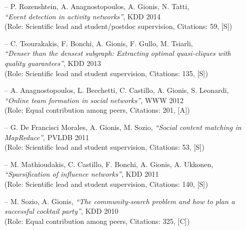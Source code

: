 \documentclass[a4paper,11pt]{res}
\begin{document}
\begin{resume}
\begin{itemize}
\item [--]
{P. Rozenshtein, A. Anagnostopoulos, A. Gionis, N. Tatti}, \\
{\em ``Event detection in activity networks''},  KDD 2014
\\
(Role: Scientific lead and student/postdoc supervision, {Citations:} 59, [S])

\item[--] 
{C. Tsourakakis, F. Bonchi, A. Gionis, F. Gullo, M. Tsiarli}, \\
{\em ``Denser than the densest subgraph: Extracting optimal quasi-cliques with quality guarantees''}, 
KDD 2013 \\
(Role: Scientific lead and student supervision, {Citations:} 135, [S])

\iffalse
\item[--] %
{A. Gionis, E. Terzi, P. Tsaparas}, 
{\em ``Opinion maximization in social networks''},
SDM 2013 \\
(Role: Equal contribution among peers, {Citations:} 61, [A])
\fi

\item[--] %
{A. Anagnostopoulos, L. Becchetti, C. Castillo, A. Gionis, S. Leonardi},\\
{\em ``Online team formation in social networks''}, WWW 2012 \\
(Role: Equal contribution among peers, {Citations:} 201, [A])

\item [--]
{ G. De Francisci Morales, A. Gionis, M. Sozio}, 
{\em ``Social content matching in MapReduce''},
PVLDB 2011
\\
(Role: Scientific lead and student supervision, {Citations:} 53, [S])		

\item [--]
{ M. Mathioudakis, C. Castillo, F. Bonchi, A. Gionis, A. Ukkonen}, \\
{\em ``Sparsification of influence networks''},
KDD 2011 \\
(Role: Scientific lead and student supervision, {Citations:} 140, [S])		

\iffalse
\item [--]
{ M. Sozio, A. Gionis},
{\em ``The community-search problem and how to plan a successful cocktail party''},
KDD 2010 \\
(Role: Equal contribution among peers, {Citations:} 325, [C])


\end{itemize}
\end{resume}
\end{document}
